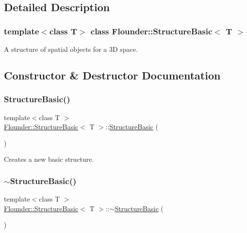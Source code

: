 \subsection{Detailed Description}
\subsubsection*{template$<$class T$>$\newline
class Flounder\+::\+Structure\+Basic$<$ T $>$}

A structure of spatial objects for a 3D space. 



\subsection{Constructor \& Destructor Documentation}
\mbox{\label{class_flounder_1_1_structure_basic_a52e87f980887f306c682561684273992}} 
\subsubsection{\texorpdfstring{Structure\+Basic()}{StructureBasic()}}
{\footnotesize\ttfamily template$<$class T $>$ \\
\hyperlink{class_flounder_1_1_structure_basic}{Flounder\+::\+Structure\+Basic}$<$ T $>$\+::\hyperlink{class_flounder_1_1_structure_basic}{Structure\+Basic} (\begin{DoxyParamCaption}{ }\end{DoxyParamCaption})}



Creates a new basic structure. 

\mbox{\label{class_flounder_1_1_structure_basic_a974c2610c8a5cca7502e4e30f2618557}} 
\subsubsection{\texorpdfstring{$\sim$\+Structure\+Basic()}{~StructureBasic()}}
{\footnotesize\ttfamily template$<$class T $>$ \\
\hyperlink{class_flounder_1_1_structure_basic}{Flounder\+::\+Structure\+Basic}$<$ T $>$\+::$\sim$\hyperlink{class_flounder_1_1_structure_basic}{Structure\+Basic} (\begin{DoxyParamCaption}{ }\end{DoxyParamCaption})}



